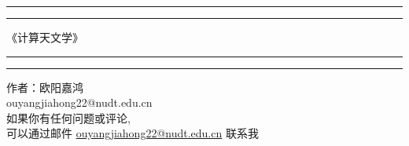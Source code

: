 \begin{titlepage}
	\centering %
	\scshape %
	\vspace*{1.5\baselineskip} %

	\rule{13cm}{1.6pt}\vspace*{-\baselineskip}\vspace*{2pt} %
	\rule{13cm}{0.4pt} %
	
		\vspace{0.75\baselineskip} %
	{	
        \Huge
			《计算天文学》 \\
    }
		\vspace{0.75\baselineskip} %
	\rule{13cm}{0.4pt}\vspace*{-\baselineskip}\vspace{3.2pt} %
	\rule{13cm}{1.6pt} %
	
		\vspace{1.75\baselineskip} %
	{\large 作者：欧阳嘉鸿\\
		\vspace*{1.2\baselineskip}
	ouyangjiahong22@nudt.edu.cn} \\
	\vfill
如果你有任何问题或评论, \\ \vspace{1mm} 可以通过邮件 \url{ouyangjiahong22@nudt.edu.cn} 联系我\\ \vspace{1mm}

\end{titlepage}